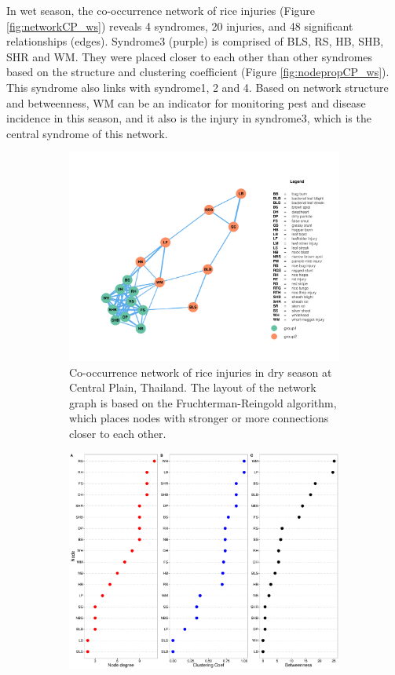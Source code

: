 In wet season, the co-occurrence network of rice injuries (Figure \ref{fig:networkCP_ws}) reveals 4 syndromes, 20 injuries, and 48 significant relationships (edges). Syndrome3 (purple) is comprised of BLS, RS, HB, SHB, SHR and WM. They were placed closer to each other than other syndromes based on the structure and clustering coefficient (Figure \ref{fig:nodepropCP_ws}). This syndrome also links with syndrome1, 2 and 4. Based on network structure and betweenness, WM can be an indicator for monitoring pest and disease incidence in this season, and it also is the injury in syndrome3, which is the central syndrome of this network. 

\begin{figure}
    \centering
    \begin{subfigure}[b]{1\textwidth}
        \includegraphics[width = 1\textwidth]{figures/networkCP_ds/networkCP_ds.pdf}
        \caption{Co-occurrence network of rice injuries in dry season at Central Plain, Thailand. The layout of the network graph is based on the Fruchterman-Reingold algorithm, which places nodes with stronger or more connections closer to each other.}
        \label{fig:networkCP_ds}
    \end{subfigure}
    \begin{subfigure}[b]{1\textwidth}
        \includegraphics[width = 1\textwidth]{figures/nodepropCP_ds/nodepropCP_ds.pdf}

\end{subfigure}
\end{figure}
